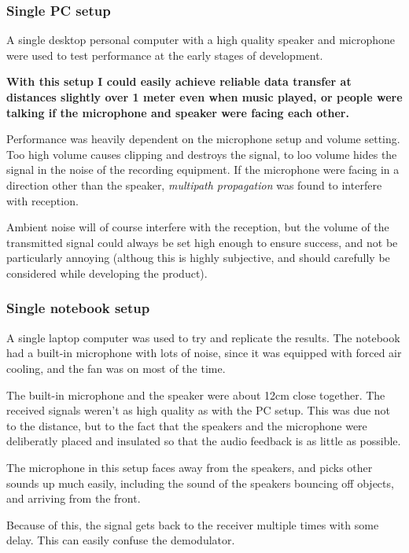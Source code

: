 \documentclass[a4paper]{article}
\begin{document}
\subsubsection{Single PC setup}

A single desktop personal computer with a high quality speaker and 
microphone were used to test performance at the early stages of 
development.

\textbf{With this setup I could easily achieve reliable data transfer 
at distances slightly over 1 meter even when music played, or people 
were talking if the microphone and speaker were facing each other.}

Performance was heavily dependent on the microphone setup and volume 
setting. Too high volume causes clipping and destroys the signal, to 
loo volume hides the signal in the noise of the recording equipment. If 
the microphone were facing in a direction other than the speaker, 
\emph{multipath propagation} was found to interfere with reception.

Ambient noise will of course interfere with the reception, but the 
volume of the transmitted signal could always be set high enough to 
ensure success, and not be particularly annoying (althoug this is 
highly subjective, and should carefully be considered while developing 
the product).

\subsubsection{Single notebook setup}

A single laptop computer was used to try and replicate the results. The 
notebook had a built-in microphone with lots of noise, since it was 
equipped with forced air cooling, and the fan was on most of the time.

The built-in microphone and the speaker were about 12cm close together. 
The received signals weren't as high quality as with the PC setup. This 
was due not to the distance, but to the fact that the speakers and the 
microphone were deliberatly placed and insulated so that the audio 
feedback is as little as possible.

The microphone in this setup faces away from the speakers, and picks 
other sounds up much easily, including the sound of the speakers 
bouncing off objects, and arriving from the front.

Because of this, the signal gets back to the receiver multiple times 
with some delay. This can easily confuse the demodulator.
\end{document}
